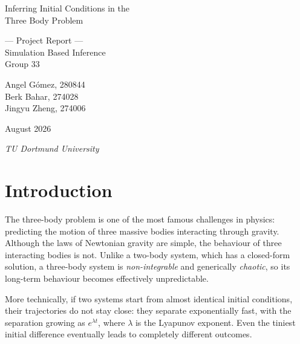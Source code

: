 \documentclass[12pt]{article}
\begin{document}
\pagestyle{empty} 

\begin{titlepage}
        \centering
        \vspace*{\baselineskip}
        
        {\huge Inferring Initial Conditions in the\\ Three Body Problem}\\[0.2\baselineskip]
        
        \vspace*{\baselineskip}
        
        {\Large --- Project Report ---\\
          Simulation Based Inference\\
          Group 33\\
          [\baselineskip]}
        \vspace*{\baselineskip}
        
        {\LARGE 
            Angel Gómez, 280844\\[10pt]
            Berk Bahar, 274028\\[10pt]
            Jingyu Zheng, 274006\\[10pt]
        }
        
        \vfill
        August 2026 \par
        \vspace*{\baselineskip}
        {\itshape TU Dortmund University\par}
\end{titlepage}

\tableofcontents 
\clearpage       


\pagestyle{fancy}       






\section{Introduction}

The three-body problem is one of the most famous challenges in physics: predicting
the motion of three massive bodies interacting through gravity. Although the laws of
Newtonian gravity are simple, the behaviour of three interacting bodies is not.
Unlike a two-body system, which has a closed-form solution, a three-body system is
\emph{non-integrable} and generically \emph{chaotic}, so its long-term behaviour
becomes effectively unpredictable.
 
More technically, if two systems start from almost identical initial conditions,
their trajectories do not stay close: they separate exponentially fast, with the
separation growing as $e^{\lambda t}$, where $\lambda$ is the Lyapunov exponent.
Even the tiniest initial difference eventually leads to completely different outcomes.
 
\end{document}
